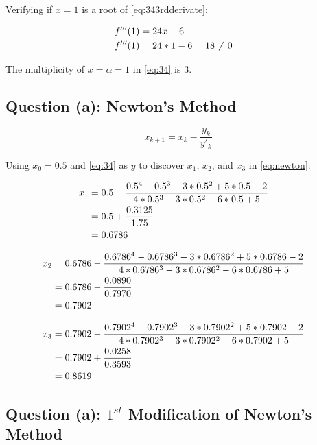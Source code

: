 	Verifying if $x=1$ is a root of \cref{eq:343rdderivate}:

	\begin{align}
		f'''(1) &= 24x - 6& \notag \\
		f'''(1) &= 24*1 - 6 = 18 \neq 0&
	\label{eq:343rdderivate1x}
	\end{align}

	The multiplicity of $x = \alpha = 1$ in \cref{eq:34} is $3$.

	\subsection{Question (a): Newton's Method}

		\begin{equation}
			x_{k+1} = x_{k} - \frac{y_{k}}{y'_{k}}
		\label{eq:newton}
		\end{equation}

		Using $x_{0} = 0.5$ and \cref{eq:34} as $y$ to discover $x_{1}$, $x_{2}$, and $x_{3}$ in \cref{eq:newton}:

		\begin{align}
			x_{1} &= 0.5 - \frac{0.5^{4} - 0.5^{3} - 3*0.5^{2} + 5*0.5 - 2}{4*0.5^{3} - 3*0.5^{2} - 6*0.5 + 5}& \notag \\
			&= 0.5 + \frac{0.3125}{1.75} & \notag \\
			&= 0.6786&
			\label{eq:34ax1}
		\end{align}

		\begin{align}
			x_{2} &= 0.6786 - \frac{0.6786^{4} - 0.6786^{3} - 3*0.6786^{2} + 5*0.6786 - 2}{4*0.6786^{3} - 3*0.6786^{2} - 6*0.6786 + 5}& \notag \\
			&= 0.6786 - \frac{0.0890}{0.7970} & \notag \\
			&= 0.7902&
			\label{eq:34ax2}
		\end{align}

		\begin{align}
			x_{3} &= 0.7902 - \frac{0.7902^{4} - 0.7902^{3} - 3*0.7902^{2} + 5*0.7902 - 2}{4*0.7902^{3} - 3*0.7902^{2} - 6*0.7902 + 5}& \notag \\
			&= 0.7902 + \frac{0.0258}{0.3593} & \notag \\
			&= 0.8619&
			\label{eq:34ax3}
		\end{align}

	\subsection{Question (a): $1^{st}$ Modification of Newton's Method}

